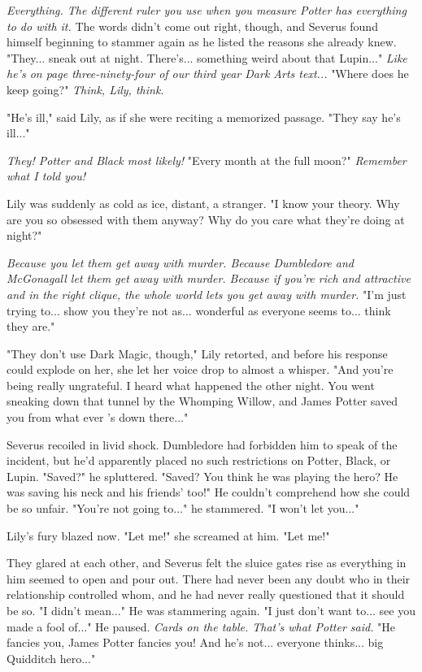 \documentclass[a4paper,11pt]{article}
\begin{document}
\emph{Everything. The different ruler you use when you measure Potter has everything to do with it.} The words didn't come out right, though, and Severus found himself beginning to stammer again as he listed the reasons she already knew. "They... sneak out at night. There's... something weird about that Lupin..." \emph{Like he's on page three-ninety-four of our third year Dark Arts text...} "Where does he keep going?" \emph{Think, Lily, think.}

"He's ill," said Lily, as if she were reciting a memorized passage. "They say he's ill..."

\emph{They! Potter and Black most likely!} "Every month at the full moon?" \emph{Remember what I told you!}

Lily was suddenly as cold as ice, distant, a stranger. "I know your theory. Why are you so obsessed with them anyway? Why do you care what they're doing at night?"

\emph{Because you let them get away with murder. Because Dumbledore and McGonagall let them get away with murder. Because if you're rich and attractive and in the right clique, the whole world lets you get away with murder.} "I'm just trying to... show you they're not as... wonderful as everyone seems to... think they are."

"They don't use Dark Magic, though," Lily retorted, and before his response could explode on her, she let her voice drop to almost a whisper. "And you're being really ungrateful. I heard what happened the other night. You went sneaking down that tunnel by the Whomping Willow, and James Potter saved you from what ever 's down there..."

Severus recoiled in livid shock. Dumbledore had forbidden him to speak of the incident, but he'd apparently placed no such restrictions on Potter, Black, or Lupin. "Saved?" he spluttered. "Saved? You think he was playing the hero? He was saving his neck and his friends' too!" He couldn't comprehend how she could be so unfair. "You're not going to..." he stammered. "I won't let you..."

Lily's fury blazed now. "Let me!" she screamed at him. "Let me!"

They glared at each other, and Severus felt the sluice gates rise as everything in him seemed to open and pour out. There had never been any doubt who in their relationship controlled whom, and he had never really questioned that it should be so. "I didn't mean..." He was stammering again. "I just don't want to... see you made a fool of..." He paused. \emph{Cards on the table. That's what Potter said.} "He fancies you, James Potter fancies you! And he's not... everyone thinks... big Quidditch hero..."
\end{document}
